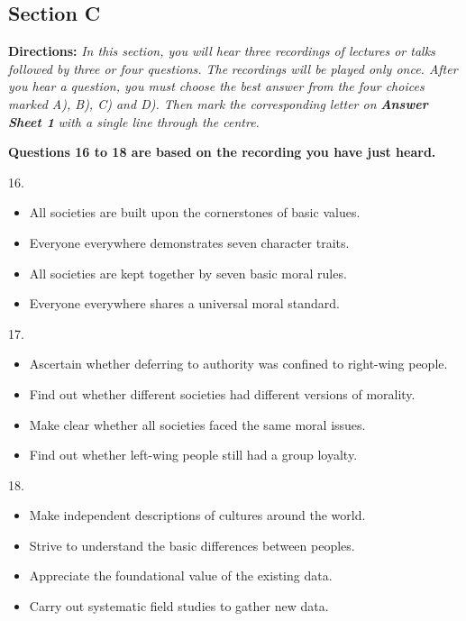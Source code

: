 \documentclass[UTF8,11pt]{ctexart}
\begin{document}
\subsection*{\textbf{Section C}}


\textbf{Directions:}\textit{ In this section, you will hear three recordings of lectures or talks followed by three or four questions. The} \textit{recordings will be played only once. After you hear a question, you must choose the best answer from the four choices} \textit{marked A), B), C) and D). Then mark the corresponding letter on }\textbf{\textit{Answer Sheet 1}}\textit{ with a single line through the centre.}


\textbf{Questions 16 to 18 are based on the recording you have just heard.}


16.


\begin{itemize}[leftmargin=2em,itemsep=.2em,topsep=.4em]\item[A.] All societies are built upon the cornerstones of basic values.
\item[B.] Everyone everywhere demonstrates seven character traits.
\item[C.] All societies are kept together by seven basic moral rules.
\item[D.] Everyone everywhere shares a universal moral standard.
\end{itemize}

17.


\begin{itemize}[leftmargin=2em,itemsep=.2em,topsep=.4em]\item[A.] Ascertain whether deferring to authority was confined to right-wing people.
\item[B.] Find out whether different societies had different versions of morality.
\item[C.] Make clear whether all societies faced the same moral issues.
\item[D.] Find out whether left-wing people still had a group loyalty.
\end{itemize}

18.


\begin{itemize}[leftmargin=2em,itemsep=.2em,topsep=.4em]\item[A.] Make independent descriptions of cultures around the world.
\item[B.] Strive to understand the basic differences between peoples.
\item[C.] Appreciate the foundational value of the existing data.
\item[D.] Carry out systematic field studies to gather new data.
\end{itemize}
\end{document}
